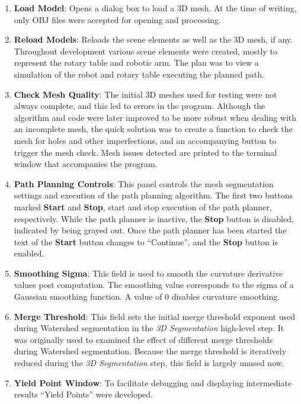 \begin{enumerate}
	\item \textbf{Load Model}: Opens a dialog box to load a 3D mesh.
		At the time of writing, only OBJ files were accepted for opening and processing.
	\item \textbf{Reload Models}: Reloads the scene elements as well as the 3D mesh, if any.
		Throughout development various scene elements were created, mostly to represent the rotary table and robotic arm.
		The plan was to view a simulation of the robot and rotary table executing the planned path.
	\item \textbf{Check Mesh Quality}: The initial 3D meshes used for testing were not always complete, and this led to errors in the program.
		Although the algorithm and code were later improved to be more robust when dealing with an incomplete mesh, the quick solution was to create a function to check the mesh for holes and other imperfections, and an accompanying button to trigger the mesh check.
		Mesh issues detected are printed to the terminal window that accompanies the program.
	\item \textbf{Path Planning Controls}: This panel controls the mesh segmentation settings and execution of the path planning algorithm.
		The first two buttons marked \textbf{Start} and \textbf{Stop}, start and stop execution of the path planner, respectively.
		While the path planner is inactive, the \textbf{Stop} button is disabled, indicated by being grayed out.
		Once the path planner has been started the text of the \textbf{Start} button changes to ``Continue'', and the \textbf{Stop} button is enabled.
	\item \textbf{Smoothing Sigma}: This field is used to smooth the curvature derivative values post computation.
		The smoothing value corresponds to the sigma of a Gaussian smoothing function.
		A value of 0 disables curvature smoothing.
	\item \textbf{Merge Threshold}: This field sets the initial merge threshold exponent used during Watershed segmentation in the \textit{3D Segmentation} high-level step.
		It was originally used to examined the effect of different merge thresholds during Watershed segmentation.
		Because the merge threshold is iteratively reduced during the \textit{3D Segmentation} step, this field is largely unused now.
	\item \textbf{Yield Point Window}: To facilitate debugging and displaying intermediate results ``Yield Points'' were developed.

\end{enumerate}
